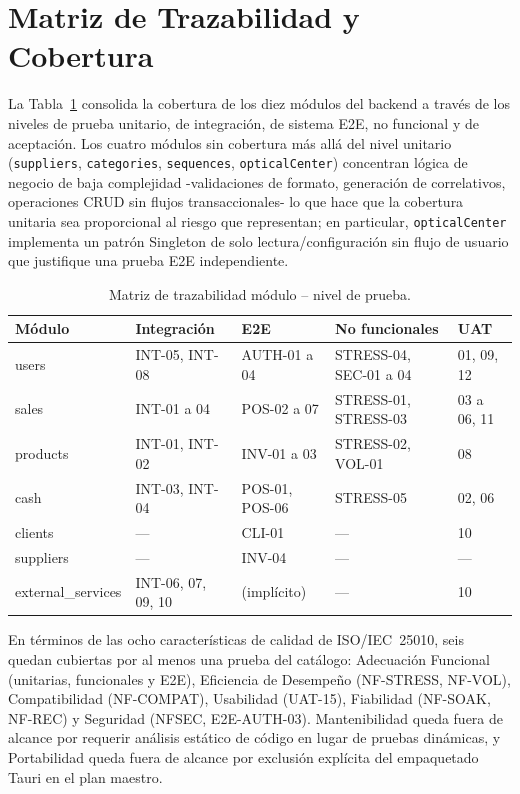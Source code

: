 \documentclass[conference]{IEEEtran}
\begin{document}
\section{Matriz de Trazabilidad y Cobertura}
\label{sec:traceability}

La Tabla~\ref{tab:traceability} consolida la cobertura de los diez módulos del backend a través de los niveles de prueba unitario, de integración, de sistema E2E, no funcional y de aceptación. Los cuatro módulos sin cobertura más allá del nivel unitario (\texttt{suppliers}, \texttt{categories}, \texttt{sequences}, \texttt{opticalCenter}) concentran lógica de negocio de baja complejidad -validaciones de formato, generación de correlativos, operaciones CRUD sin flujos transaccionales- lo que hace que la cobertura unitaria sea proporcional al riesgo que representan; en particular, \texttt{opticalCenter} implementa un patrón Singleton de solo lectura/configuración sin flujo de usuario que justifique una prueba E2E independiente.

\begin{table}[htbp]
  \caption{Matriz de trazabilidad módulo -- nivel de prueba.}
  \label{tab:traceability}
  \centering
  \footnotesize
  \begin{tabular}{l p{3.2cm} p{2.6cm} p{4.4cm} p{2cm}}
    \toprule
    \textbf{Módulo} & \textbf{Integración} & \textbf{E2E} & \textbf{No funcionales} & \textbf{UAT} \\
    \midrule
    users & INT-05, INT-08 & AUTH-01 a 04 & STRESS-04, SEC-01 a 04 & 01, 09, 12 \\
    sales & INT-01 a 04 & POS-02 a 07 & STRESS-01, STRESS-03 & 03 a 06, 11 \\
    products & INT-01, INT-02 & INV-01 a 03 & STRESS-02, VOL-01 & 08 \\
    cash & INT-03, INT-04 & POS-01, POS-06 & STRESS-05 & 02, 06 \\
    clients & --- & CLI-01 & --- & 10 \\
    suppliers & --- & INV-04 & --- & --- \\
    external\_services & INT-06, 07, 09, 10 & (implícito) & --- & 10 \\
    \bottomrule
  \end{tabular}
\end{table}

En términos de las ocho características de calidad de ISO/IEC~25010, seis quedan cubiertas por al menos una prueba del catálogo: Adecuación Funcional (unitarias, funcionales y E2E), Eficiencia de Desempeño (NF-STRESS, NF-VOL), Compatibilidad (NF-COMPAT), Usabilidad (UAT-15), Fiabilidad (NF-SOAK, NF-REC) y Seguridad (NFSEC, E2E-AUTH-03). Mantenibilidad queda fuera de alcance por requerir análisis estático de código en lugar de pruebas dinámicas, y Portabilidad queda fuera de alcance por exclusión explícita del empaquetado Tauri en el plan maestro.
\end{document}
